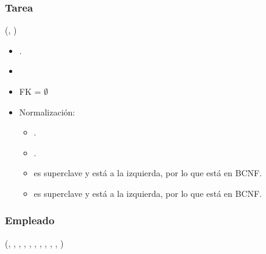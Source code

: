 \subsubsection{Tarea}

    (, )


    \begin{itemize}
        \item {}.
        \item {}
        \item FK = $\emptyset$

        \item Normalización:
            
            \begin{itemize}
                \item {}.
                \item {}.
                    
                \item {} es superclave y está a la izquierda, por lo
                    que está en BCNF.
                \item {} es superclave y está a la izquierda, por lo
                    que está en BCNF.
            \end{itemize}
    \end{itemize}


\subsubsection{Empleado}

    (, , , ,
        , , , ,
        , , )


